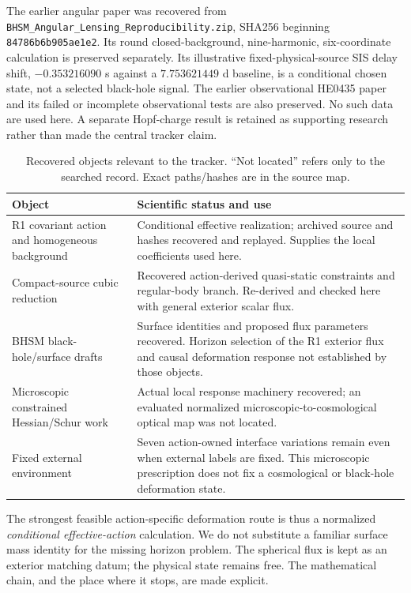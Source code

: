 \documentclass[11pt,a4paper]{article}
\begin{document}
The earlier angular paper was recovered from
\texttt{BHSM\_Angular\_Lensing\_Reproducibility.zip}, SHA256 beginning
\texttt{84786b6b905ae1e2}. Its round closed-background, nine-harmonic,
six-coordinate calculation is preserved separately. Its illustrative
fixed-physical-source SIS delay shift, $-0.353216090$ s against a
$7.753621449$ d baseline, is a conditional chosen state, not a selected
black-hole signal. The earlier observational HE0435 paper and its failed
or incomplete observational tests are also preserved. No such data are
used here. A separate Hopf-charge result is retained as supporting
research rather than made the central tracker claim.

\begin{table}[t]
\centering\small
\caption{Recovered objects relevant to the tracker. ``Not located'' refers
only to the searched record. Exact paths/hashes are in the source map.}
\begin{tabular}{p{.28\linewidth}p{.63\linewidth}}
\toprule Object & Scientific status and use\\\midrule
R1 covariant action and homogeneous background & Conditional effective
realization; archived source and hashes recovered and replayed. Supplies
the local coefficients used here.\\
Compact-source cubic reduction & Recovered action-derived quasi-static
constraints and regular-body branch. Re-derived and checked here with
general exterior scalar flux.\\
BHSM black-hole/surface drafts & Surface identities and proposed flux
parameters recovered. Horizon selection of the R1 exterior flux and
causal deformation response not established by those objects.\\
Microscopic constrained Hessian/Schur work & Actual local response machinery
recovered; an evaluated normalized microscopic-to-cosmological optical
map was not located.\\
Fixed external environment & Seven action-owned interface variations
remain even when external labels are fixed. This microscopic prescription
does not fix a cosmological or black-hole deformation state.\\\bottomrule
\end{tabular}
\end{table}

The strongest feasible action-specific deformation route is thus a normalized \emph{conditional
effective-action} calculation. We do not substitute a familiar surface
mass identity for the missing horizon problem. The spherical flux is
kept as an exterior matching datum; the physical state remains free.
The mathematical chain, and the place where it stops, are made explicit.
\end{document}
